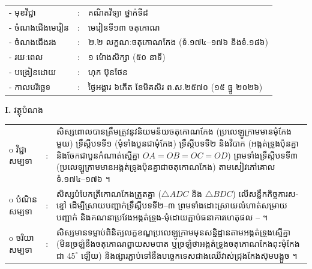 \documentclass[a4paper,10pt]{article}
\newcommand{\wcirc}{{\CourierBullet\fontsize{9.5pt}{11pt}\selectfont o}}
\newcommand{\cnum}[1]{{\fontsize{10.5pt}{12pt}\selectfont\ding{\numexpr171+#1\relax}}\hspace{0.2em}}
\newcommand{\tri}[1]{\ensuremath{\triangle #1}}
\begin{document}
{\renewcommand{\arraystretch}{0.95}
\hspace*{4.05cm}%
\begin{tabular}{@{}l l l@{}}
  - \hspace{0.35cm} មុខវិជ្ជា & : & គណិតវិទ្យា ថ្នាក់ទី៨ \\
  - \hspace{0.35cm} ចំណងជើងមេរៀន & : & មេរៀនទី១៣ ចតុកោណ \\
  - \hspace{0.35cm} ចំណងជើងរង & : & ២.២ លក្ខណៈចតុកោណកែង (ទំ.១៧៤--១៧៦ និងទំ.១៨៦) \\
  - \hspace{0.35cm} រយៈពេល & : & ១ ម៉ោងសិក្សា (៥០ នាទី) \\
  - \hspace{0.35cm} បង្រៀនដោយ & : & ហុក ប៊ុនថែន \\
  - \hspace{0.35cm} កាលបរិច្ឆេទ & : & ថ្ងៃអង្គារ ៦កើត ខែមិគសិរ ព.ស.២៥៧០ (១៥ ធ្នូ ២០២៦) \\
\end{tabular}

\vspace{1pt}

\textbf{I.} {\muol វត្ថុបំណង}\\[1pt]
\hspace*{0.55cm}%
\begin{tabular}{@{}l l L{14.2cm}@{}}
  \wcirc \hspace{0.25cm} វិជ្ជាសម្បទា & : & សិស្សពោលបានត្រឹមត្រូវនូវនិយមន័យចតុកោណកែង (ប្រលេឡូក្រាមមានមុំកែងមួយ) ទ្រឹស្ដីបទទី១ (មុំទាំងបួនជាមុំកែង) ទ្រឹស្ដីបទទី២ និងវិបាក (អង្កត់ទ្រូងប៉ុនគ្នា និងចែកជាបួនកំណាត់ស្មើគ្នា $OA=OB=OC=OD$) ព្រមទាំងទ្រឹស្ដីបទទី៣ (ប្រលេឡូក្រាមមានអង្កត់ទ្រូងប៉ុនគ្នាជាចតុកោណកែង) តាមសៀវភៅគោល ទំ.១៧៤--១៧៦ ។ \\
  \wcirc \hspace{0.25cm} បំណិនសម្បទា & : & សិស្សបំបែកត្រីកោណកែងត្រួតគ្នា ($\tri{ADC}$ និង $\tri{BDC}$) លើសន្លឹកកិច្ចការស-ខ្មៅ ដើម្បីស្រាយបញ្ជាក់ទ្រឹស្ដីបទទី២--៣ ព្រមទាំងដោះស្រាយលំហាត់សម្រាយបញ្ជាក់ និងគណនាប្រវែងអង្កត់ទ្រូង-មុំដោយភ្ជាប់ធនាគារហេតុផល \cnum{1}--\cnum{5} ។ \\
  \wcirc \hspace{0.25cm} ចរិយាសម្បទា & : & សិស្សមានទម្លាប់ពិនិត្យលក្ខខណ្ឌប្រលេឡូក្រាមមុនសន្និដ្ឋានតាមអង្កត់ទ្រូងស្មើគ្នា (មិនច្រឡំនឹងចតុកោណព្នាយសមបាត ឬច្រឡំថាអង្កត់ទ្រូងចតុកោណកែងពុះមុំកែងជា $45^\circ$ ឡើយ) និងផ្សារភ្ជាប់ទៅនឹងបច្ចេកទេសជាងឈើវាស់ជ្រុងកែងស៊ុមបង្អួច ។ \\
\end{tabular}

}
\end{document}
